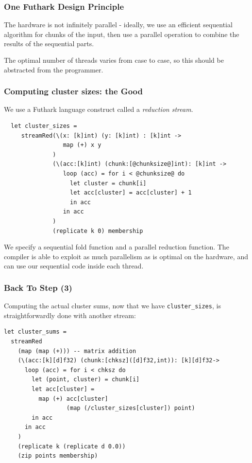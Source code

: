 \documentclass[rgb,dvipsnames]{beamer}
\begin{document}
\begin{frame}
  \frametitle{One Futhark Design Principle}

  \begin{block}{}
    The hardware is not infinitely parallel - ideally, we use an
    efficient sequential algorithm for chunks of the input, then use a
    parallel operation to combine the results of the sequential parts.
  \end{block}


  The optimal number of threads varies from case to case, so this
  should be abstracted from the programmer.
\end{frame}

\begin{frame}[fragile]
  \frametitle{Computing cluster sizes: the Good}

  We use a Futhark language construct called a \textit{reduction
    stream}.

  \begin{lstlisting}
  let cluster_sizes =
     streamRed(\(x: [k]int) (y: [k]int) : [k]int ->
                 map (+) x y
              )
              (\(acc:[k]int) (chunk:[@chunksize@]int): [k]int ->
                 loop (acc) = for i < @chunksize@ do
                   let cluster = chunk[i]
                   let acc[cluster] = acc[cluster] + 1
                   in acc
                 in acc
              )
              (replicate k 0) membership
\end{lstlisting}

We specify a sequential fold function and a parallel reduction
function.  The compiler is able to exploit as much parallelism as is
optimal on the hardware, and can use our sequential code inside each
thread.

\end{frame}

\begin{frame}[fragile]
  \frametitle{Back To Step (3)}

  Computing the actual cluster sums, now that we have
  \texttt{cluster\_sizes}, is straightforwardly done with another
  stream:

  \begin{lstlisting}
let cluster_sums = 
  streamRed
    (map (map (+))) -- matrix addition
    (\(acc:[k][d]f32) (chunk:[chksz]([d]f32,int)): [k][d]f32->
      loop (acc) = for i < chksz do
        let (point, cluster) = chunk[i]
        let acc[cluster] =
          map (+) acc[cluster]
                  (map (/cluster_sizes[cluster]) point)
        in acc
      in acc
    )
    (replicate k (replicate d 0.0))
    (zip points membership)
\end{lstlisting}
\end{frame}
\end{document}
